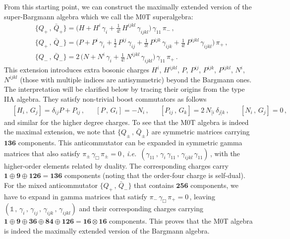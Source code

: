 \documentclass[11pt]{article}
\renewcommand{\emph}[1]{\textit{#1}}
\begin{document}
From this starting point, we can construct the maximally extended version of the super-Bargmann algebra which we call the M0T superalgebra:
\begin{align}
    &\big\{Q_+\,, \, \bar{Q}_+\big\} = \Big(H + H^i \, \gamma_i + \tfrac{1}{4!}\,H^{ijkl} \, \gamma_{ijkl}\Big) \, \gamma_{11} \, \pi_-\,,\\[4pt]
    & \big\{Q_+\,, \, \bar{Q}_-\big\} = \Big(P + P^i \, \gamma_i + \tfrac12\,P^{ij} \, \gamma_{ij} + \tfrac{1}{3!}\,P^{ijk}\,\gamma_{ijk} + \tfrac{1}{4!}\,P^{ijkl}\,\gamma_{ijkl}\Big) \, \pi_+\,,\\[4pt]
    &\big\{Q_-\,, \, \bar{Q}_-\big\} = 2\,\Big( N + N^i \, \gamma_i + \tfrac{1}{4!} \, N^{ijkl}\, \gamma_{ijkl} \Big) \, \gamma_{11} \, \pi_+\,.
\end{align}
This extension introduces extra bosonic charges $H^i$, $H^{ijkl}$, $P$, $P^{ij}$, $P^{ijk}$, $P^{ijkl}$, $N^i$, $N^{ijkl}$ (those with multiple indices are antisymmetric) beyond the Bargmann ones. The interpretation will be clarified below by tracing their origins from the type IIA algebra.
They satisfy non-trivial boost commutators as follows
\begin{align}
    &[H_i\,, \, G_j] = \delta_{ij}P+P_{ij}\,,&&[P\,, \, G_i]=-N_i\,, &&[P_{ij}\,, \, G_k] = 2\,N_{[i} \, \delta_{j]k}\,,&& [N_i\,, \, G_j]=0\,,
\end{align}
and similar for the higher degree charges. To see that the M0T algebra is indeed the maximal extension, we note that $\{Q_\pm\,,\,\bar{Q}_\pm\}$ are symmetric matrices carrying $\mathbf{136}$ components. This anticommutator can be expanded in symmetric gamma matrices that also satisfy $\pi_\pm \, \gamma^{\phantom{\dagger}}_\Box \, \pi_\pm=0$\,, \emph{i.e.}~$(\gamma^{}_{11}\,, \, \gamma^{}_i \, \gamma^{}_{11}\,, \, \gamma^{}_{ijkl} \, \gamma^{}_{11})$\,, with the higher-order elements related by duality. The corresponding charges carry $\mathbf{1}\oplus\mathbf{9}\oplus\mathbf{126}=\mathbf{136}$ components (noting that the order-four charge is self-dual). For the mixed anticommutator $\{Q^{}_+\,, \, \bar{Q}^{}_-\}$ that contains $\mathbf{256}$ components, we have to expand in gamma matrices that satisfy $\pi^{}_- \, \gamma^{\phantom{\dagger}}_\Box \, \pi^{}_+ = 0$\,, leaving $(\mathbb{1}\,, \, \gamma^{}_i\,, \, \gamma^{}_{ij}\,, \, \gamma^{}_{ijk}\,, \, \gamma^{}_{ijkl})$ and their corresponding charges carrying $\mathbf{1}\oplus\mathbf{9}\oplus\mathbf{36}\oplus\mathbf{84}\oplus\mathbf{126}=\mathbf{16}\otimes\mathbf{16}$ components. This proves that the M0T algebra is indeed the maximally extended version of the Bargmann algebra.
\end{document}
